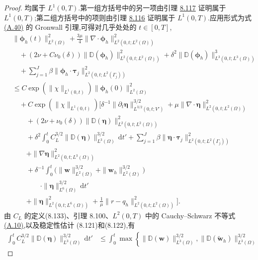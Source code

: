 \begin{theorem}[自然正则性下的一致有限元误差估计]
\begin{proof}
均属于 $L^1(0,T)$.第一组方括号中的另一项由引理
\hyperref[lem:smagorinsky-error-other-terms-integrability]{8.117} 证明属于
$L^1(0,T)$;第二组方括号中的项则由引理
\hyperref[lem:smagorinsky-error-bracket-integrability]{8.116} 证明属于
$L^1(0,T)$.应用形式为式\hyperref[eq:appendix-a-40]{(A.40)} 的 Gronwall
引理,可得对几乎处处的 $t\in[0,T]$,
\[
\begin{aligned}
&\|\symbf{\phi}_h(t)\|_{L^2(\Omega)}^2
 +\frac{3\mu}{4}
       \|\nabla\cdot\symbf{\phi}_h\|_{L^2(0,t;L^2(\Omega))}^2\\
&\quad+(2\nu+C\nu_0(\delta))
       \|\mathbb{D}(\symbf{\phi}_h)\|_{L^2(0,t;L^2(\Omega))}^2
 +\delta^2\|\mathbb{D}(\symbf{\phi}_h)\|_{L^3(0,t;L^3(\Omega))}^3\\
&\quad+\sum_{j=1}^J\beta
       \|\symbf{\phi}_h\cdot\symbf{\tau}_j\|_{L^2(0,t;L^2(\Gamma_j))}^2\\
&\le C\exp\!\left(\|\chi\|_{L^1(0,t)}\right)
       \|\symbf{\phi}_h(0)\|_{L^2(\Omega)}^2\\
&\quad+C\exp\!\left(\|\chi\|_{L^1(0,t)}\right)\Biggl[
       \delta^{-1}
       \|\partial_t\symbf{\eta}\|_{L^{3/2}(0,t;V')}^{3/2}
 +\mu\|\nabla\cdot\symbf{\eta}\|_{L^2(0,t;L^2(\Omega))}^2\\
&\qquad+(2\nu+\nu_0(\delta))
       \|\mathbb{D}(\symbf{\eta})\|_{L^2(0,t;L^2(\Omega))}^2\\
&\qquad+\delta^2\int_0^t C_L^{3/2}
       \|\mathbb{D}(\symbf{\eta})\|_{L^3(\Omega)}^{3/2}\,\mathrm{d}t'
 +\sum_{j=1}^J\beta
       \|\symbf{\eta}\cdot\symbf{\tau}_j\|_{L^2(0,t;L^2(\Gamma_j))}^2\\
&\qquad+\|\nabla\symbf{\eta}\|_{L^2(0,t;L^3(\Omega))}^2\\
&\qquad+\delta^{-1}\int_0^t
       \bigl(\|\bm{w}\|_{L^2(\Omega)}^{3/2}
               +\|\bm{w}_h\|_{L^2(\Omega)}^{3/2}\bigr)\\
&\qquad\qquad\cdot\|\symbf{\eta}\|_{L^6(\Omega)}^{3/2}\,\mathrm{d}t'\\
&\qquad+\|\symbf{\eta}\|_{L^2(0,t;L^6(\Omega))}^2
 +\frac1\mu\|r-q_h\|_{L^2(0,t;L^2(\Omega))}^2\Biggr].
\end{aligned}
\]
由 $C_L$ 的定义(8.133)、引理 8.100、$L^2(0,T)$ 中的
Cauchy--Schwarz 不等式\hyperref[eq:appendix-a-10]{(A.10)},以及稳定性估计
(8.121)和(8.122),有
\[
\begin{aligned}
\int_0^t C_L^{3/2}
       \|\mathbb{D}(\symbf{\eta})\|_{L^3(\Omega)}^{3/2}\,\mathrm{d}t'
&\le\int_0^t
       \max\left\{
          \|\mathbb{D}(\bm{w})\|_{L^3(\Omega)}^{3/2},
          \|\mathbb{D}(\widetilde{\bm{w}}_h)\|_{L^3(\Omega)}^{3/2}

\end{aligned}\]
\end{proof}
\end{theorem}
